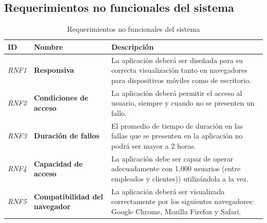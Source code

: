 \documentclass[12pt]{article}
\begin{document}
\subsection{Requerimientos no funcionales del sistema}

{\small
\begin{longtable}[H]{m{2cm}m{4cm}m{6cm}}
    \caption{\normalsize{Requerimientos no funcionales del sistema}}\\
    
    \toprule
    
    \centering \textbf{ID} & \centering  \textbf{Nombre} & \centering \small \textbf{Descripción} \tabularnewline
    \midrule
    \textit{RNF1} & \textbf{Responsiva} & La aplicación deberá ser diseñada para su correcta visualización tanto en navegadores para dispositivos móviles como de escritorio. \tabularnewline
    \textit{RNF2} & \textbf{Condiciones de acceso} & La aplicación deberá permitir el acceso al usuario, siempre y cuando no se presenten un fallo. \tabularnewline
    \textit{RNF3} & \textbf{Duración de fallos} & El promedio de tiempo de duración en las fallas que se presenten en la aplicación no podrá ser mayor a 2 horas. \tabularnewline
    \textit{RNF4} & \textbf{Capacidad de acceso} & La aplicación debe ser capaz de operar adecuadamente con 1,000 usuarios (entre empleados y clientes)) utilizándola a la vez. \tabularnewline
    \textit{RNF5} & \textbf{Compatibilidad del navegador} & La aplicación deberá ser visualizada correctamente por los siguientes navegadores: Google Chrome, Mozilla Firefox y Safari. \tabularnewline
    \bottomrule
\end{longtable}
}
\end{document}
